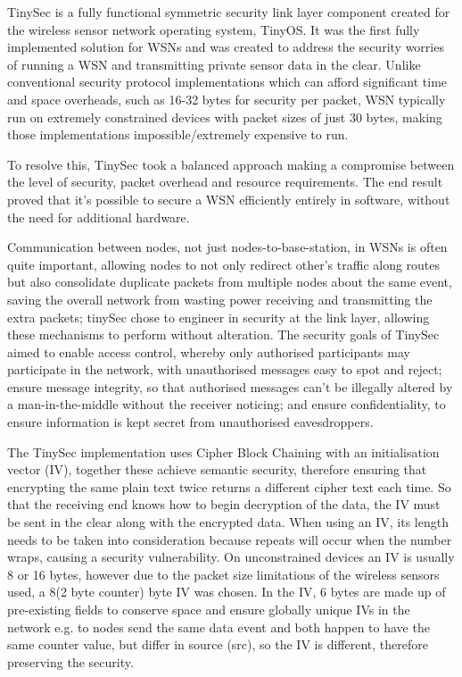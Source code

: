 TinySec is a fully functional symmetric security link layer component created for the wireless sensor network operating system, TinyOS. It was the first fully implemented solution for WSNs and was created to address the security worries of running a WSN and transmitting private sensor data in the clear. Unlike conventional security protocol implementations which can afford significant time and space overheads, such as 16-32 bytes for security per packet, WSN typically run on extremely constrained devices with packet sizes of just 30 bytes, making those implementations impossible/extremely expensive to run.

To resolve this, TinySec took a balanced approach making a compromise between the level of security, packet overhead and resource requirements. The end result proved that it's possible to secure a WSN efficiently entirely in software, without the need for additional hardware. 

Communication between nodes, not just nodes-to-base-station, in WSNs is often quite important, allowing nodes to not only redirect other's traffic along routes but also consolidate duplicate packets from multiple nodes about the same event, saving the overall network from wasting power receiving and transmitting the extra packets; tinySec chose to engineer in security at the link layer, allowing these mechanisms to perform without alteration. The security goals of TinySec aimed to enable access control, whereby only authorised participants may participate in the network, with unauthorised messages easy to spot and reject; ensure message integrity, so that authorised messages can't be illegally altered by a man-in-the-middle without the receiver noticing; and ensure confidentiality, to ensure information is kept secret from unauthorised eavesdroppers. 

The TinySec implementation uses Cipher Block Chaining with an initialisation vector (IV), together these achieve semantic security, therefore ensuring that encrypting the same plain text twice returns a different cipher text each time. So that the receiving end knows how to begin decryption of the data, the IV must be sent in the clear along with the encrypted data. When using an IV, its length needs to be taken into consideration because repeats will occur when the number wraps, causing a security vulnerability. On unconstrained devices an IV is usually 8 or 16 bytes, however due to the packet size limitations of the wireless sensors used, a 8(2 byte counter) byte IV was chosen. In the IV, 6 bytes are made up of pre-existing fields to conserve space and ensure globally unique IVs in the network e.g. to nodes send the same data event and both happen to have the same counter value, but differ in source (src), so the IV is different, therefore preserving the security.

